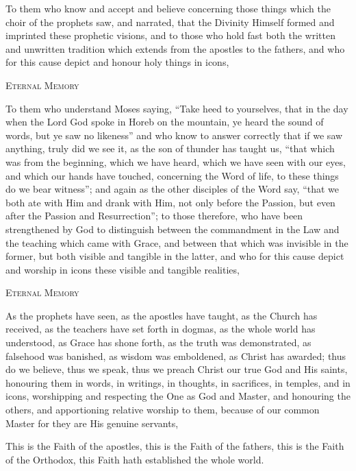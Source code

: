 To them who know and accept and believe concerning those things which the choir of the prophets saw, and narrated, that the Divinity Himself formed and imprinted these prophetic visions, and to those who hold fast both the written and unwritten tradition which extends from the apostles to the fathers, and who for this cause depict and honour holy things in icons,

\begin{center}
\textsc{Eternal Memory} 
\end{center}

To them who understand Moses saying, ``Take heed to yourselves, that in the day when the Lord God spoke in Horeb on the mountain, ye heard the sound of words, but ye saw no likeness'' and who know to answer correctly that if we saw anything, truly did we see it, as the son of thunder has taught us, ``that which was from the beginning, which we have heard, which we have seen with our eyes, and which our hands have touched, concerning the Word of life, to these things do we bear witness''; and again as the other disciples of the Word say, ``that we both ate with Him and drank with Him, not only before the Passion, but even after the Passion and Resurrection''; to those therefore, who have been strengthened by God to distinguish between the commandment in the Law and the teaching which came with Grace, and between that which was invisible in the former, but both visible and tangible in the latter, and who for this cause depict and worship in icons these visible and tangible realities,

\begin{center}
\textsc{Eternal Memory} 
\end{center}

As the prophets have seen, as the apostles have taught, as the Church has received, as the teachers have set forth in dogmas, as the whole world has understood, as Grace has shone forth, as the truth was demonstrated, as falsehood was banished, as wisdom was emboldened, as Christ has awarded; thus do we believe, thus we speak, thus we preach Christ our true God and His saints, honouring them in words, in writings, in thoughts, in sacrifices, in temples, and in icons, worshipping and respecting the One as God and Master, and honouring the others, and apportioning relative worship to them, because of our common Master for they are His genuine servants,

This is the Faith of the apostles,  this is the Faith of the fathers, this is the Faith of the Orthodox, this Faith hath established the whole world.

